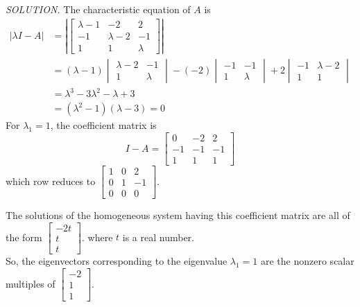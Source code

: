 \documentclass{article}
\begin{document}
    \textit{SOLUTION. }The characteristic equation of $A$ is
    \begin{equation*}
        \begin{split}
            |\lambda I - A|  & = \left| \begin{bmatrix}
            \lambda - 1 & -2 & 2\\
            -1 & \lambda - 2 & -1\\
            1 & 1 & \lambda
        \end{bmatrix} \right| \\
         & = (\lambda - 1) \begin{vmatrix}
             \lambda - 2 & -1\\
             1 & \lambda
         \end{vmatrix} - (-2) \begin{vmatrix}
             -1 & -1 \\
             1 & \lambda
         \end{vmatrix} +
         2 \begin{vmatrix}
             -1 & \lambda - 2 \\
             1 & 1
         \end{vmatrix} \\
         & = \lambda^3 - 3\lambda^2 - \lambda + 3 \\
         & = (\lambda^2 - 1)(\lambda - 3) = 0
        \end{split}
    \end{equation*}
    For $\lambda_1 = 1$, the coefficient matrix is
    \[ I - A = \begin{bmatrix}
        0 & -2 & 2\\
        -1 & -1 & -1\\
        1 & 1 & 1
    \end{bmatrix}\]
    which row reduces to $ \begin{bmatrix}
        1 & 0 & 2 \\
        0 & 1 & -1\\
        0 & 0 & 0
    \end{bmatrix}$.
    
    The solutions of the homogeneous system having this coefficient matrix are all of the form $ \begin{bmatrix}
        -2t \\ t \\ t
    \end{bmatrix}$.
    where $t$ is a real number. \\So, the eigenvectors corresponding to the eigenvalue $\lambda_1 = 1$ are the nonzero scalar
    multiples of $ \begin{bmatrix}
        -2 \\ 1 \\ 1
    \end{bmatrix}$.
    
\end{document}
